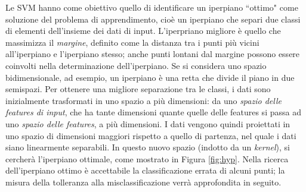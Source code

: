 \documentclass[oneside, openany]{book}
\begin{document}
	Le SVM hanno come obiettivo quello di identificare un iperpiano ``ottimo" come soluzione del problema di apprendimento, cioè un iperpiano che separi due classi di elementi dell'insieme dei dati di input. L'iperpriano migliore è quello che massimizza il \textit{margine}, definito come la distanza tra i punti più vicini all'iperpiano e l'iperpiano stesso; anche punti lontani dal margine possono essere coinvolti nella determinazione dell'iperpiano. Se si considera uno spazio bidimensionale, ad esempio, un iperpiano è una retta che divide il piano in due semispazi. Per ottenere una migliore separazione tra le classi, i dati sono inizialmente trasformati in uno spazio a più dimensioni: da uno \textit{spazio delle features di input}, che ha tante dimensioni quante quelle delle features si passa ad uno \textit{spazio delle features}, a più dimensioni. I dati vengono quindi proiettati in uno spazio di dimensioni maggiori rispetto a quello di partenza, nel quale i dati siano linearmente separabili. In questo nuovo spazio (indotto da un \textit{kernel}), si cercherà l'iperpiano ottimale, come mostrato in Figura \ref{fig:hyp}. Nella ricerca dell'iperpiano ottimo è accettabile la classificazione errata di alcuni punti; la misura della tolleranza alla misclassificazione verrà approfondita in seguito.
\end{document}
